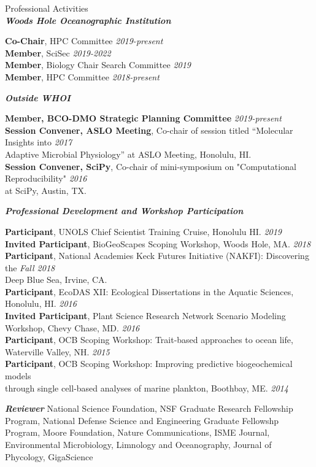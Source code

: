 \documentclass{resume}
\begin{document}
\begin{rSection}{Professional Activities}
\\

\textbf{\textit{Woods Hole Oceanographic Institution}}

{\textbf{Co-Chair}, HPC Committee} \hfill {\em 2019-present} \\
{\textbf{Member}, SciSec} \hfill {\em 2019-2022} \\
{\textbf{Member}, Biology Chair Search Committee} \hfill {\em 2019} \\ 
{\textbf{Member}, HPC Committee} \hfill {\em 2018-present} 

\textbf{\textit{Outside WHOI}}

\textbf{Member, BCO-DMO Strategic Planning Committee} \hfill {\em 2019-present}\\
\textbf{Session Convener, ASLO Meeting}, Co-chair of session titled “Molecular Insights into \hfill {\em 2017} \\ Adaptive Microbial Physiology” at
ASLO Meeting, Honolulu, HI.\\
\textbf{Session Convener, SciPy}, Co-chair of mini-symposium on "Computational Reproducibility" \hfill {\em 2016} \\  at
SciPy, Austin, TX.

\textbf{\textit{Professional Development and Workshop Participation}}

  {\textbf{Participant}, UNOLS Chief Scientist Training Cruise, Honolulu HI.} \hfill {\em 2019} \\
  {\textbf{Invited Participant}, BioGeoScapes Scoping Workshop, Woods Hole, MA.} \hfill {\em 2018} \\
  {\textbf{Participant}, National Academies Keck Futures Initiative (NAKFI): Discovering the \hfill {\em Fall 2018}
    \\  Deep Blue Sea, Irvine, CA.}  \\
  {\textbf{Participant}, EcoDAS XII: Ecological Dissertations in the Aquatic Sciences, Honolulu, HI.} \hfill {\em 2016} \\
  {\textbf{Invited Participant}, Plant Science Research Network Scenario Modeling \\ Workshop, Chevy Chase, MD.} \hfill {\em 2016} \\
  {\textbf{Participant}, OCB Scoping Workshop: Trait-based approaches to ocean life, Waterville Valley, NH.} \hfill {\em 2015} \\
  {\textbf{Participant}, OCB Scoping Workshop: Improving predictive biogeochemical models \\ through single cell-based analyses of marine plankton, Boothbay, ME.} \hfill {\em 2014} 
  
\textbf{\textit{Reviewer}}
National Science Foundation, NSF Graduate Research Fellowship Program, National Defense Science and Engineering Graduate Fellowshp Program, Moore Foundation, Nature Communications, ISME Journal, Environmental Microbiology, Limnology and Oceanography, Journal of
Phycology, GigaScience



\end{rSection}
\end{document}
